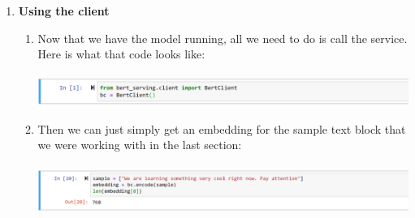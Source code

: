 \documentclass{article}
\begin{document}
\begin{enumerate}
    \item \textbf{Using the client}
    \begin{enumerate}
    \item[] Now that we have the model running, all we need to do is call the service.  Here is what that code looks like:\\
    \vspace{.1cm}\\
    \includegraphics[scale = .7]{service_start.png}
    \vspace{.2cm}\\
    
    \item[] Then we can just simply get an embedding for the sample text block that we were working with in the last section:\\
    \vspace{.1cm}\\
    \includegraphics[scale = .625]{service_sample.png}
    

\end{enumerate}
\end{enumerate}
\end{document}
